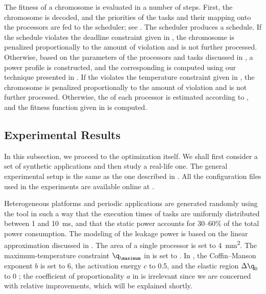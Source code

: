 The fitness of a chromosome is evaluated in a number of steps. First, the
chromosome is decoded, and the priorities of the tasks and their mapping onto
the processors are fed to the scheduler; see . The scheduler
produces a schedule. If the schedule violates the deadline constraint given in
, the chromosome is penalized proportionally
to the amount of violation and is not further processed. Otherwise, based on the
parameters of the processors and tasks discussed in , a power
profile \mp is constructed, and the corresponding  \mq is computed
using our technique presented in . If the
 violates the temperature constraint given in
, the chromosome is penalized proportionally
to the amount of violation and is not further processed. Otherwise, the
 of each processor is estimated according to
, and the fitness function given in
 is computed.

\subsection{Experimental Results}

In this subsection, we proceed to the optimization itself. We shall first
consider a set of synthetic applications and then study a real-life one. The
general experimental setup is the same as the one described in
. All the configuration files used in the
experiments are available online at \cite{eslab2011}.

Heterogeneous platforms and periodic applications are generated randomly using
the  tool \cite{dick1998} in such a way that the execution times of
tasks are uniformly distributed between 1 and 10~ms, and that the static power
accounts for 30--60\% of the total power consumption. The modeling of the
leakage power is based on the linear approximation discussed in
. The area of a single processor is set to
4~mm\textsuperscript{2}. The maximum-temperature constraint $\q_\maximum$ in
 is set to . In
, the Coffin--Manson exponent $b$ is set to 6, the
activation energy $c$ to 0.5, and the elastic region $\Delta \q_0$ to 0
\cite{jedec2010}; the coefficient of proportionality $a$ in
 is irrelevant since we are concerned with
relative improvements, which will be explained shortly.

